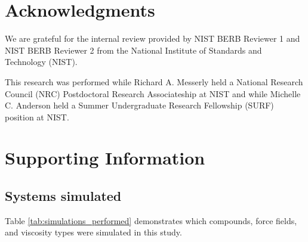 \documentclass[preprint,review,12pt]{elsarticle}
\begin{document}
	\section*{Acknowledgments}
	
	We are grateful for the internal review provided by NIST BERB Reviewer 1 and NIST BERB Reviewer 2 from the National Institute of Standards and Technology (NIST). 
	
	This research was performed while Richard A. Messerly held a National Research Council (NRC) Postdoctoral Research Associateship at NIST and while Michelle C. Anderson held a Summer Undergraduate Research Fellowship (SURF) position at NIST.
	
	
	
	
	\section{Supporting Information}
	
	
	\subsection{Systems simulated}
	
	Table \ref{tab:simulations_performed} demonstrates which compounds, force fields, and viscosity types were simulated in this study.
	
\end{document}
